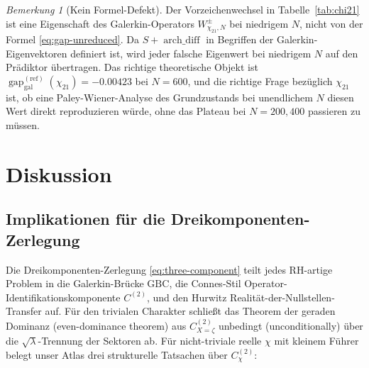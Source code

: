 \documentclass[10pt,twocolumn]{article}
\theoremstyle{definition}
\theoremstyle{remark}
\newtheorem{remark}[theorem]{Bemerkung}
\newcommand{\gap}{\operatorname{gap}}
\newcommand{\chifn}{\chi}
\newcommand{\archdiff}{\operatorname{arch\_diff}}
\begin{document}
\begin{remark}[Kein Formel-Defekt]
\label{rem:chi21-not-defect}
Der Vorzeichenwechsel in Tabelle~\ref{tab:chi21} ist eine Eigenschaft des
Galerkin-Operators $W^\pm_{\chifn_{21},N}$ bei niedrigem $N$, nicht von der
Formel \eqref{eq:gap-unreduced}. Da $S+\archdiff$ in
Begriffen der Galerkin-Eigenvektoren definiert ist, wird jeder
falsche Eigenwert bei niedrigem $N$ auf den Prädiktor übertragen. Das richtige theoretische
Objekt ist $\gap_{\mathrm{gal}}^{(\mathrm{ref})}(\chifn_{21})=-0.00423$ bei $N=600$,
und die richtige Frage bezüglich $\chifn_{21}$ ist, ob eine
Paley-Wiener-Analyse des Grundzustands bei unendlichem $N$ diesen Wert direkt reproduzieren würde,
ohne das Plateau bei $N=200,400$ passieren zu müssen.
\end{remark}

\section{Diskussion}
\label{sec:discussion}

\subsection{Implikationen für die Dreikomponenten-Zerlegung}
\label{sec:discussion-three-component}

Die Dreikomponenten-Zerlegung \eqref{eq:three-component} teilt
jedes RH-artige Problem in die Galerkin-Brücke $\mathrm{GBC}$, die
Connes-Stil Operator-Identifikationskomponente $C^{(2)}$, und den
Hurwitz Realität-der-Nullstellen-Transfer auf. Für den trivialen Charakter
schließt das Theorem der geraden Dominanz (even-dominance theorem) aus \cite{RH_II} $C^{(2)}_{X=\zeta}$
unbedingt (unconditionally) über die $\sqrt{\lambda}$-Trennung der Sektoren ab.
Für nicht-triviale reelle $\chifn$ mit kleinem Führer belegt unser Atlas
drei strukturelle Tatsachen über $C^{(2)}_{\chifn}$:
\end{document}
